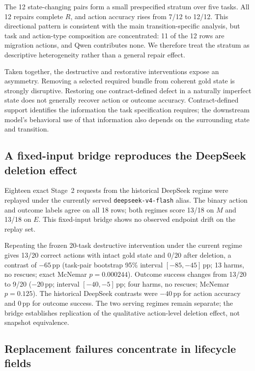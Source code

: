 \documentclass[11pt]{article}
\newcommand{\Rsupport}{R}
\newcommand{\Maction}{M}
\newcommand{\Eoutcome}{E}
\newcommand{\pp}{\,\mathrm{pp}}
\begin{document}
The 12 state-changing pairs form a small prespecified stratum over five tasks. All 12 repairs complete \(\Rsupport\), and action accuracy rises from 7/12 to 12/12. This directional pattern is consistent with the main transition-specific analysis, but task and action-type composition are concentrated: 11 of the 12 rows are migration actions, and Qwen contributes none. We therefore treat the stratum as descriptive heterogeneity rather than a general repair effect.

Taken together, the destructive and restorative interventions expose an asymmetry. Removing a selected required bundle from coherent gold state is strongly disruptive. Restoring one contract-defined defect in a naturally imperfect state does not generally recover action or outcome accuracy. Contract-defined support identifies the information the task specification requires; the downstream model's behavioral use of that information also depends on the surrounding state and transition.

\subsection{A fixed-input bridge reproduces the DeepSeek deletion effect}
\label{sec:bridge}

Eighteen exact Stage~2 requests from the historical DeepSeek regime were replayed under the currently served \texttt{deepseek-v4-flash} alias. The binary action and outcome labels agree on all 18 rows; both regimes score 13/18 on \(\Maction\) and 13/18 on \(\Eoutcome\). This fixed-input bridge shows no observed endpoint drift on the replay set.

Repeating the frozen 20-task destructive intervention under the current regime gives 13/20 correct actions with intact gold state and 0/20 after deletion, a contrast of \(-65\pp\) (task-pair bootstrap 95\% interval \([-85,-45]\pp\); 13 harms, no rescues; exact McNemar \(p=0.000244\)). Outcome success changes from 13/20 to 9/20 (\(-20\pp\); interval \([-40,-5]\pp\); four harms, no rescues; McNemar \(p=0.125\)). The historical DeepSeek contrasts were \(-40\pp\) for action accuracy and \(0\pp\) for outcome success. The two serving regimes remain separate; the bridge establishes replication of the qualitative action-level deletion effect, not snapshot equivalence.

\subsection{Replacement failures concentrate in lifecycle fields}
\end{document}
